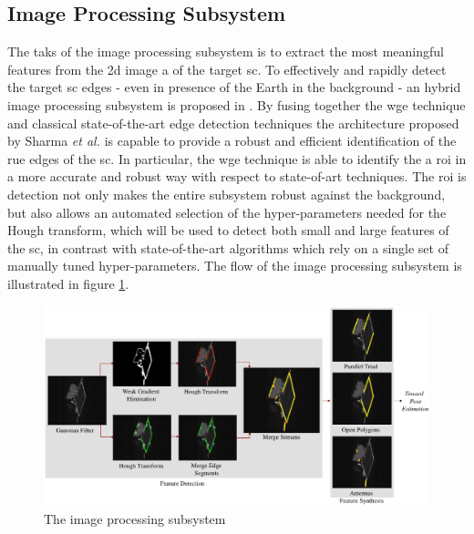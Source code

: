 \subsection{Image Processing Subsystem}
The taks of the image processing subsystem is to extract the most meaningful features from the \acrshort{2d} image a of the target \acrshort{sc}. To effectively and rapidly detect the target \acrshort{sc} edges - even in presence of the Earth in the background - an hybrid image processing subsystem is proposed in \cite{Sharma2018}.
By fusing together the \acrshort{wge} technique and classical state-of-the-art edge detection techniques the architecture proposed by Sharma \textit{et al.} is capable to provide a robust and efficient identification of the rue edges of the \acrshort{sc}.
In particular, the \acrshort{wge} technique is able to identify the a \acrfull{roi} in a more accurate and robust way with respect to state-of-art techniques. The \acrshort{roi} is detection not only makes the entire subsystem robust against the background, but also allows an automated selection of the hyper-parameters needed for the Hough transform, which will be used to detect both small and large features of the \acrshort{sc}, in contrast with state-of-the-art algorithms which rely on a single set of manually tuned hyper-parameters.
The flow of the image processing subsystem is illustrated in figure \ref{fig:imageProcessingSubsystem}.

\begin{figure}[htbp]
  \centering
  \includegraphics[width=1.0\textwidth]{gfx/imageProcessingSubsystem.eps}
  \caption{The image processing subsystem \cite{Sharma2018}}
  \label{fig:imageProcessingSubsystem}
\end{figure}

